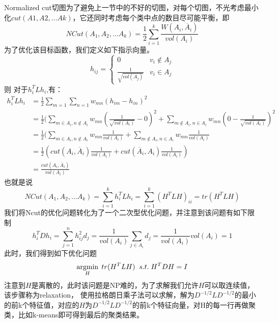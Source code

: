 Normalized cut切图为了避免上一节中的不好的切图，对每个切图，不光考虑最小化$cut(A1,A2,...Ak)$，它还同时考虑每个类中点的数目尽可能平衡，即
\begin{equation*}
NCut(A_1,A_2,...A_k) = \frac{1}{2}\sum\limits_{i=1}^{k}\frac{W(A_i, \overline{A}_i )}{vol(A_i)}
\end{equation*}
为了优化该目标函数，我们定义如下指示向量。
\begin{equation*}
h_{ij}= \begin{cases} 0& { v_i \notin A_j}\\ \frac{1}{\sqrt{vol(A_j)}}& { v_i \in A_j} \end{cases}
\end{equation*}
则
对于$h_i^TLh_i$,有：
\begin{align} h_i^TLh_i & = \frac{1}{2}\sum\limits_{m=1}\sum\limits_{n=1}w_{mn}(h_{im}-h_{in})^2 \\& =\frac{1}{2}(\sum\limits_{m \in A_i, n \notin A_i}w_{mn}(\frac{1}{\sqrt{vol(A_i)}} - 0)^2 +  \sum\limits_{m \notin A_i, n \in A_i}w_{mn}(0 - \frac{1}{\sqrt{vol(A_i)}} )^2\\& = \frac{1}{2}(\sum\limits_{m \in A_i, n \notin A_i}w_{mn}\frac{1}{vol(A_i)} +  \sum\limits_{m \notin A_i, n \in A_i}w_{mn}\frac{1}{vol(A_i)}\\& = \frac{1}{2}(cut(A_i, \overline{A}_i) \frac{1}{vol(A_i)} + cut(\overline{A}_i, A_i) \frac{1}{vol(A_i)}) \\& =  \frac{cut(A_i, \overline{A}_i)}{vol(A_i)} 
\end{align}
也就是说
\begin{equation*}
NCut(A_1,A_2,...A_k) = \sum\limits_{i=1}^{k}h_i^TLh_i = \sum\limits_{i=1}^{k}(H^TLH)_{ii} = tr(H^TLH)
\end{equation*}
我们将Ncut的优化问题转化为了一个二次型优化问题，并注意到该问题有如下限制
\begin{equation*}
h_i^TDh_i = \sum\limits_{j=1}^{n}h_{ij}^2d_j =\frac{1}{vol(A_i)}\sum\limits_{j \in A_i}d_j= \frac{1}{vol(A_i)}vol(A_i) =1
\end{equation*}
此时，我们得到如下优化问题
\begin{equation*}
\operatorname*{argmin}\limits_{H} \; tr(H^TLH) \;\; s.t.\;H^TDH=I
\end{equation*}
注意到$H$是离散的，此时该问题是NP难的，为了求解我们允许$H$可以取连续值，该步骤称为relaxation，
使用拉格朗日乘子法可以求解，解为$D^{-1/2}LD^{-1/2}$的最小的前k个特征值，对应的$H$为$D^{-1/2}LD^{-1/2}$的前k个特征向量，对H的每一行再做聚类，比如k-means即可得到最后的聚类结果。